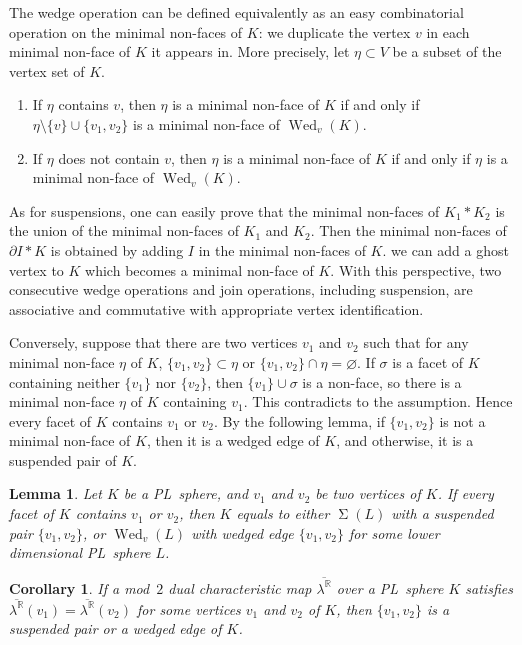 \documentclass[11pt]{amsart}
\theoremstyle{plain}
\newtheorem{lemma}[theorem]{Lemma}
\newtheorem{corollary}[theorem]{Corollary}
\numberwithin{equation}{section}
\theoremstyle{definition}
\newcommand{\R}{\mathbb{R}}
\DeclareMathOperator{\wed}{Wed}
\DeclareMathOperator{\susp}{\Sigma}
\begin{document}
The wedge operation can be defined equivalently as an easy combinatorial operation on the minimal non-faces of $K$: we duplicate the vertex $v$ in each minimal non-face of $K$ it appears in.
More precisely, let $\eta \subset V$ be a subset of the vertex set of $K$.
\begin{enumerate}
  \item If $\eta$ contains $v$, then $\eta$ is a minimal non-face of $K$ if and only if $\eta \setminus \{v\} \cup \{v_1, v_2 \}$ is a minimal non-face of $\wed_v(K)$.
  \item If $\eta$ does not contain $v$, then $\eta$ is a minimal non-face of $K$ if and only if $\eta$ is a minimal non-face of $\wed_v(K)$.
\end{enumerate}

As for suspensions, one can easily prove that the minimal non-faces of $K_1 \ast K_2$ is the union of the minimal non-faces of $K_1$ and $K_2$.
Then the minimal non-faces of $\partial I \ast K$ is obtained by adding $I$ in the minimal non-faces of $K$.
we can add a ghost vertex to $K$ which becomes a minimal non-face of $K$.
With this perspective, two consecutive wedge operations and join operations, including suspension, are associative and commutative with appropriate vertex identification.

Conversely, suppose that there are two vertices $v_1$ and $v_2$ such that for any minimal non-face $\eta$ of $K$, $\{v_1, v_2\} \subset \eta$ or $\{v_1, v_2\} \cap \eta = \varnothing$.
If $\sigma$ is a facet of $K$ containing neither $\{v_1\}$ nor $\{v_2\}$, then $\{v_1\} \cup \sigma$ is a non-face, so there is a minimal non-face $\eta$ of $K$ containing $v_1$.
This contradicts to the assumption.
Hence every facet of $K$ contains $v_1$ or $v_2$.
By the following lemma, if $\{v_1, v_2\}$ is not a minimal non-face of $K$, then it is a wedged edge of $K$, and otherwise, it is a suspended pair of $K$.

\begin{lemma} \cite{CP_wedge_2} \label{lemma:DCM}
    Let $K$ be a PL~sphere, and $v_1$ and $v_2$ be two vertices of $K$.
    If every facet of $K$ contains $v_1$ or $v_2$, then $K$ equals to either $\susp(L)$ with a suspended pair $\{v_1, v_2\}$, or $\wed_v(L)$ with wedged edge $\{v_1, v_2\}$ for some lower dimensional PL~sphere $L$.
\end{lemma}

\begin{corollary} \label{cor:repetition of rows}
    If a mod~$2$ dual characteristic map $\overline{\lambda^\R}$ over a PL~sphere $K$ satisfies $\overline{\lambda^\R}(v_1) = \overline{\lambda^\R}(v_2)$ for some vertices $v_1$ and $v_2$ of $K$, then $\{v_1, v_2\}$ is a suspended pair or a wedged edge of $K$.
\end{corollary}
\end{document}
